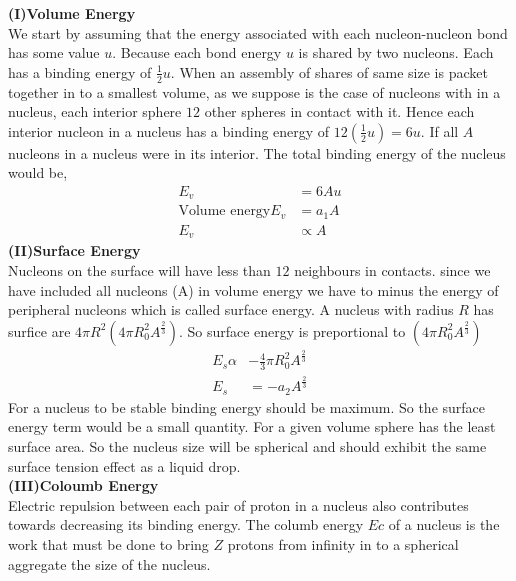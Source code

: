 \textbf{(I)\quad Volume Energy}\\
We start by assuming that the energy associated with each nucleon-nucleon bond has some value $u$. Because each bond energy $u$ is shared by two nucleons. Each has a binding energy of $\frac{1}{2}u$. When an assembly of shares of same size is packet together in to a smallest volume, as we suppose is the case of nucleons with in a nucleus, each interior sphere $12$ other spheres in contact with it. Hence each interior nucleon in a nucleus has a binding  energy of $12(\frac{1}{2}u)=6u$. If all $A$ nucleons in a nucleus were in its interior. The total binding energy of the nucleus would be,
\begin{align*}
E_v&=6Au\\
\text{Volume energy} E_v&=a_1 A\\
E_v&\propto A
\end{align*}
\textbf{(II)\quad Surface Energy}\\
Nucleons on the surface will have less than $12$ neighbours in contacts. since we have included all nucleons (A) in volume energy we have to minus the energy of peripheral nucleons which is called surface energy. A nucleus with radius $R$ has surfice are $4\pi R^2(4\pi R^2_0A^\frac{2}{3})$. So surface energy is preportional to $(4\pi R^2_0A^\frac{2}{3}) $\\
\begin{align*}
E_s\alpha&-\frac{4}{3}\pi R^2_0A^\frac{2}{3}\\
E_s&=-a_2 A^\frac{2}{3}
\end{align*}
For a nucleus to be stable binding energy should be maximum. So the surface energy term would be a small quantity. For a given volume sphere has the least surface area. So the nucleus size will be spherical and should exhibit the same surface tension effect as a liquid drop.\\
\textbf{(III)\quad Coloumb Energy}\\
Electric repulsion between each pair of proton in a nucleus also contributes towards decreasing its binding energy. The columb energy $Ec$ of a nucleus is the work that must be done to bring $Z$ protons from infinity in to a spherical aggregate the size of the nucleus.
